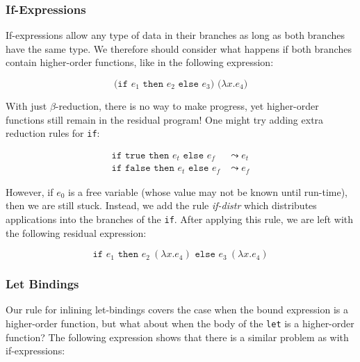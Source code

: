 \documentclass[runningheads]{llncs}
\begin{document}

\subsubsection{If-Expressions}

If-expressions allow any type of data in their branches as long as both branches have the same type. We therefore should consider what happens if both branches contain higher-order functions, like in the following expression:

\begin{equation*}
  \texttt{(if $e_1$ then $e_2$ else $e_3$) ($\lambda x. e_4$)}
\end{equation*}

With just $\beta$-reduction, there is no way to make progress, yet higher-order functions still remain in the residual program! One might try adding extra reduction rules for \texttt{if}:

\begin{equation*}
  \begin{split}
    \texttt{if true then $e_t$ else $e_f$} &\leadsto e_t \\
    \texttt{if false then $e_t$ else $e_f$} &\leadsto e_f
  \end{split}
\end{equation*}

However, if $e_0$ is a free variable (whose value may not be known until run-time), then we are still stuck. Instead, we add the rule \textit{\scriptsize if-distr} which distributes applications into the branches of the \texttt{if}. After applying this rule, we are left with the following residual expression:

\begin{equation*}
  \texttt{if $e_1$ then $e_2\ (\lambda x. e_4)$ else $e_3\ (\lambda x. e_4)$}
\end{equation*}

\subsubsection{Let Bindings}

Our rule for inlining let-bindings covers the case when the bound expression is a higher-order function, but what about when the body of the \texttt{let} is a higher-order function? The following expression shows that there is a similar problem as with if-expressions:
\end{document}
